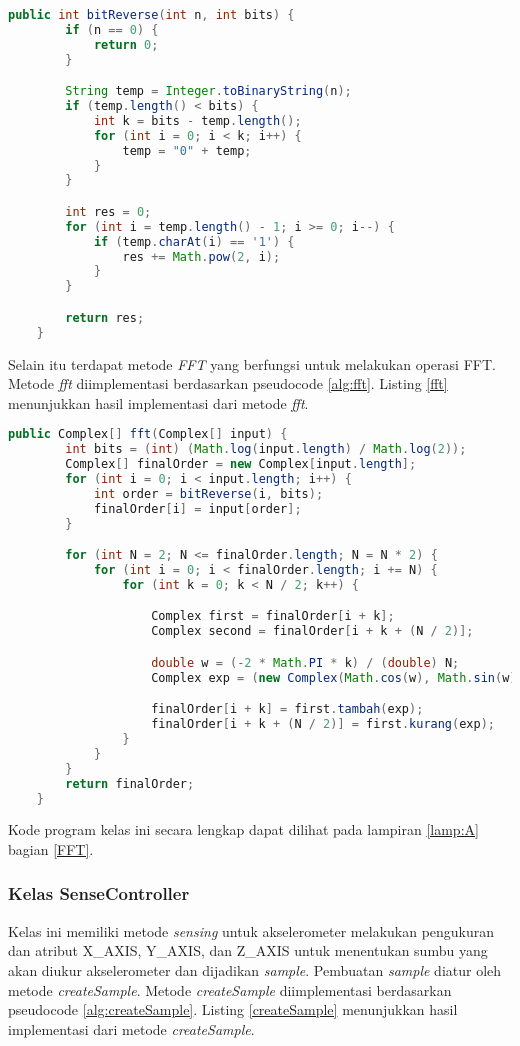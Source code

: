 \begin{lstlisting}[label=bitReverse, language=Java, caption=Metode bitReverse(), numbers=none]
    public int bitReverse(int n, int bits) {
		if (n == 0) {
			return 0;
		}

		String temp = Integer.toBinaryString(n);
		if (temp.length() < bits) {
			int k = bits - temp.length();
			for (int i = 0; i < k; i++) {
				temp = "0" + temp;
			}
		}

		int res = 0;
		for (int i = temp.length() - 1; i >= 0; i--) {
			if (temp.charAt(i) == '1') {
				res += Math.pow(2, i);
			}
		}

		return res;
	}
\end{lstlisting}
Selain itu terdapat metode {\it FFT} yang berfungsi untuk melakukan operasi FFT. Metode {\it fft} diimplementasi berdasarkan pseudocode \ref{alg:fft}. Listing \ref{fft} menunjukkan hasil implementasi dari metode {\it fft}.
 
\begin{lstlisting}[label=fft, language=Java, caption=Metode fft(), numbers=none]
    public Complex[] fft(Complex[] input) {
		int bits = (int) (Math.log(input.length) / Math.log(2));
		Complex[] finalOrder = new Complex[input.length];
		for (int i = 0; i < input.length; i++) {
			int order = bitReverse(i, bits);
			finalOrder[i] = input[order];
		}

		for (int N = 2; N <= finalOrder.length; N = N * 2) {
			for (int i = 0; i < finalOrder.length; i += N) {
				for (int k = 0; k < N / 2; k++) {

					Complex first = finalOrder[i + k];
					Complex second = finalOrder[i + k + (N / 2)];

					double w = (-2 * Math.PI * k) / (double) N;
					Complex exp = (new Complex(Math.cos(w), Math.sin(w)).kali(second));

					finalOrder[i + k] = first.tambah(exp);
					finalOrder[i + k + (N / 2)] = first.kurang(exp);
				}
			}
		}
		return finalOrder;
	}
\end{lstlisting}

Kode program kelas ini secara lengkap dapat dilihat pada lampiran \ref{lamp:A} bagian \ref{FFT}.

\subsubsection{Kelas SenseController}
Kelas ini memiliki metode {\it sensing} untuk akselerometer melakukan pengukuran dan atribut X\_AXIS, Y\_AXIS, dan Z\_AXIS untuk menentukan sumbu yang akan diukur akselerometer dan dijadikan {\it sample}. Pembuatan {\it sample} diatur oleh metode {\it createSample}. Metode {\it createSample} diimplementasi berdasarkan pseudocode \ref{alg:createSample}. Listing \ref{createSample} menunjukkan hasil implementasi dari metode {\it createSample}.

